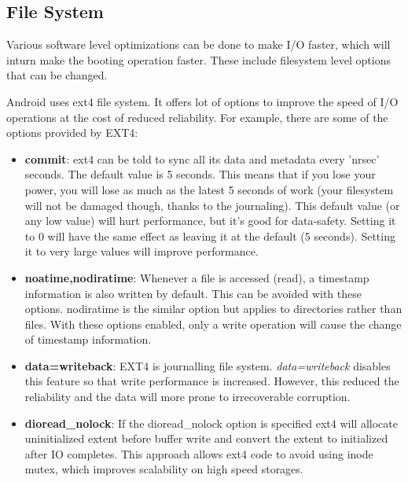 \subsection{File System}

Various software level optimizations can be done to make I/O
faster, which will inturn make the booting operation faster.
These include filesystem level options that can be changed.

Android uses ext4 file system. It offers lot of options to improve
the speed of I/O operations at the cost of reduced reliability.
For example, there are some of the options provided by EXT4:
\begin{itemize}
	\item \textbf{commit}: ext4 can be told to sync all its data and metadata
			every 'nrsec' seconds. The default value is 5 seconds.
			This means that if you lose your power, you will lose
			as much as the latest 5 seconds of work (your
			filesystem will not be damaged though, thanks to the
			journaling).  This default value (or any low value)
			will hurt performance, but it's good for data-safety.
			Setting it to 0 will have the same effect as leaving
			it at the default (5 seconds).
			Setting it to very large values will improve
			performance.

	\item \textbf{noatime,nodiratime}: Whenever a file is accessed (read), a
			timestamp information is also written by default. This can
			be avoided with these options. nodiratime is the similar option
			but applies to directories rather than files. With these options
			enabled, only a write operation will cause the change of timestamp
			information.
	\item \textbf{data=writeback}: EXT4 is journalling file system. \textit{data=writeback}
			disables this feature so that write performance is increased. However,
			this reduced the reliability and the data will more prone to irrecoverable
			corruption.
	\item \textbf{dioread\_nolock}: If the dioread\_nolock option is specified
			ext4 will allocate uninitialized extent before buffer
			write and convert the extent to initialized after IO
			completes. This approach allows ext4 code to avoid
			using inode mutex, which improves scalability on high
			speed storages.	
\end{itemize}

